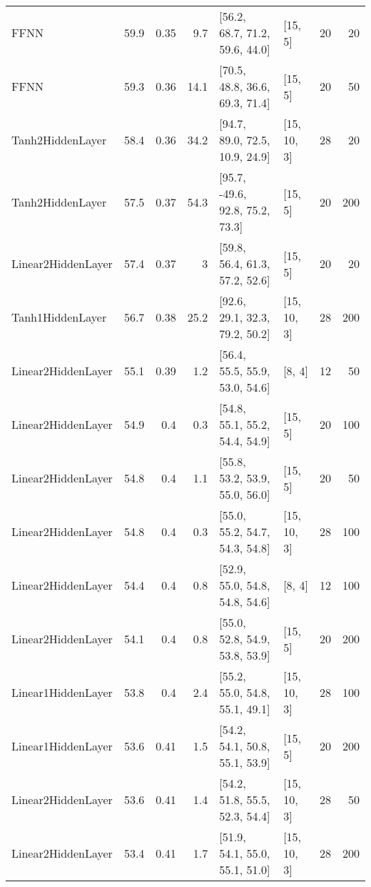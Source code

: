 \begin{table*}
\begin{tabular}{lrrrllrr}
 FFNN               & 59.9 &  0.35 &      9.7 & [56.2, 68.7, 71.2, 59.6, 44.0]  & [15, 5]        &         20 &       20 \\
 FFNN               & 59.3 &  0.36 &     14.1 & [70.5, 48.8, 36.6, 69.3, 71.4]  & [15, 5]        &         20 &       50 \\
 Tanh2HiddenLayer   & 58.4 &  0.36 &     34.2 & [94.7, 89.0, 72.5, 10.9, 24.9]  & [15, 10, 3]    &         28 &       20 \\
 Tanh2HiddenLayer   & 57.5 &  0.37 &     54.3 & [95.7, -49.6, 92.8, 75.2, 73.3] & [15, 5]        &         20 &      200 \\
 Linear2HiddenLayer & 57.4 &  0.37 &      3   & [59.8, 56.4, 61.3, 57.2, 52.6]  & [15, 5]        &         20 &       20 \\
 Tanh1HiddenLayer   & 56.7 &  0.38 &     25.2 & [92.6, 29.1, 32.3, 79.2, 50.2]  & [15, 10, 3]    &         28 &      200 \\
 Linear2HiddenLayer & 55.1 &  0.39 &      1.2 & [56.4, 55.5, 55.9, 53.0, 54.6]  & [8, 4]         &         12 &       50 \\
 Linear2HiddenLayer & 54.9 &  0.4  &      0.3 & [54.8, 55.1, 55.2, 54.4, 54.9]  & [15, 5]        &         20 &      100 \\
 Linear2HiddenLayer & 54.8 &  0.4  &      1.1 & [55.8, 53.2, 53.9, 55.0, 56.0]  & [15, 5]        &         20 &       50 \\
 Linear2HiddenLayer & 54.8 &  0.4  &      0.3 & [55.0, 55.2, 54.7, 54.3, 54.8]  & [15, 10, 3]    &         28 &      100 \\
 Linear2HiddenLayer & 54.4 &  0.4  &      0.8 & [52.9, 55.0, 54.8, 54.8, 54.6]  & [8, 4]         &         12 &      100 \\
 Linear2HiddenLayer & 54.1 &  0.4  &      0.8 & [55.0, 52.8, 54.9, 53.8, 53.9]  & [15, 5]        &         20 &      200 \\
 Linear1HiddenLayer & 53.8 &  0.4  &      2.4 & [55.2, 55.0, 54.8, 55.1, 49.1]  & [15, 10, 3]    &         28 &      100 \\
 Linear1HiddenLayer & 53.6 &  0.41 &      1.5 & [54.2, 54.1, 50.8, 55.1, 53.9]  & [15, 5]        &         20 &      200 \\
 Linear2HiddenLayer & 53.6 &  0.41 &      1.4 & [54.2, 51.8, 55.5, 52.3, 54.4]  & [15, 10, 3]    &         28 &       50 \\
 Linear2HiddenLayer & 53.4 &  0.41 &      1.7 & [51.9, 54.1, 55.0, 55.1, 51.0]  & [15, 10, 3]    &         28 &      200 \\

\end{tabular}
\end{table*}

